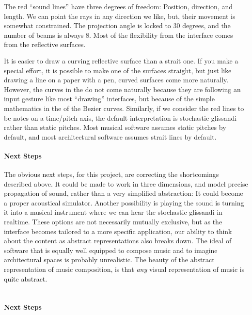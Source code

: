 The red ``sound lines'' have three degrees of freedom: Position,
direction, and length. We can point the rays in any direction we like,
but, their movement is somewhat constrained.  The projection angle is
locked to 30 degrees, and the number of beams is always 8. Most of the
flexibility from the interface comes from the reflective surfaces.

It is easier to draw a curving reflective surface than a strait
one. If you make a special effort, it is possible to make one of the
surfaces straight, but just like drawing a line on a paper with a pen,
curved surfaces come more naturally. However, the curves in the  do not
come naturally because they are following an input gesture like most
``drawing'' interfaces, but because of the simple mathematics in the
of the Bezier curves. Similarly, if we consider the red lines to be
notes on a time/pitch axis, the default interpretation is stochastic
glissandi rather than static pitches. Most musical software assumes
static pitches by default, and most architectural software assumes
strait lines by default.

\paragraph{Next Steps}
The obvious next steps, for this project, are correcting the
shortcomings described above. It could be made to work in three
dimensions, and model precise propagation of sound, rather than a very
simplified abstraction: It could become a proper acoustical
simulator. Another possibility is playing the sound is turning it into
a musical instrument where we can hear the stochastic glissandi in
realtime. These options are not necessarily mutually exclusive, but as
the interface becomes tailored to a more specific application, our
ability to think about the content as abstract representations also
breaks down. The ideal of software that is equally well equipped to
compose music and to imagine architectural spaces is probably
unrealistic. The beauty of the abstract representation of music
composition, is that \textit{any} visual representation of music is
quite abstract.

\section{\polytempic}

\paragraph{Next Steps}

